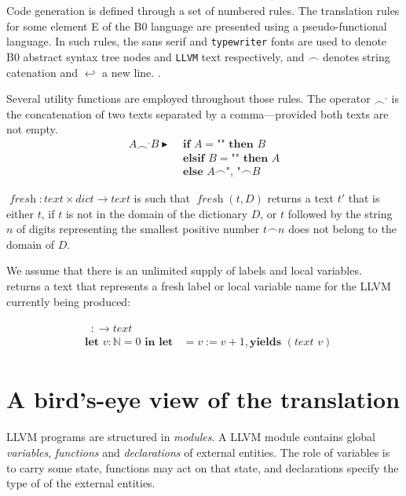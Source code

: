 \documentclass{article}
\newcommand{\nl}[0]{\ensuremath{\hookleftarrow}}
\DeclareMathOperator{\conc}{\smallfrown}
\DeclareMathOperator{\isdef}{\blacktriangleright}
\DeclareMathOperator{\fresh}{\textit{fresh}}
\DeclareMathOperator{\name}{\mathcal{L}()}
\begin{document}
Code generation is defined through a set of numbered rules. The
translation rules for some element \textsf{E} of the B0 language are
presented using a pseudo-functional language.  In such rules, the
\textsf{sans serif} and \texttt{typewriter} fonts are used to denote
\textsf{B0} abstract syntax tree nodes and \texttt{LLVM} text
respectively, and $\conc$ denotes string catenation and $\nl$ a new
line. .

Several utility functions are employed throughout those rules.  The
operator $\conc^,$ is the concatenation of two texts separated by a
comma---provided both texts are not empty.
\begin{align}
A \conc^, B \isdef & \textbf{ if } A = \texttt{""} \textbf{ then } B \nonumber \\
& \textbf{ elsif } B = \texttt{""} \textbf{ then } A \nonumber \\
& \textbf{ else } A \conc \texttt{", "} \conc B \nonumber
\end{align}

$\fresh: text \times dict \rightarrow text$ is such that
$\fresh(t, D)$  returns a text $t'$ that is either $t$, if $t$ is not in
the domain of the dictionary $D$, or $t$ followed by the string $n$ of
digits representing the smallest positive number $t \conc n$ does not
belong to the domain of $D$.

We assume that there is an unlimited supply of labels and local variables.
$\name$ returns a text that represents a fresh label or local variable
name for the LLVM currently being produced:
\begin{framed}
\begin{align}
\begin{split}
  &\name : \rightarrow text \\
  &\textbf{let } v : \mathbb{N} = 0 \textbf{ in let } \name = v := v + 1, \textbf{yields } (\textit{text } v)
\end{split}
\end{align}
\end{framed}

\section{A bird's-eye view of the translation}
\label{sec:view}

LLVM programs are structured in \emph{modules}. A LLVM module contains
global \emph{variables}, \emph{functions} and \emph{declarations} of
external entities. The role of variables is to carry some state,
functions may act on that state, and declarations specify the type of
of the external entities.
\end{document}
